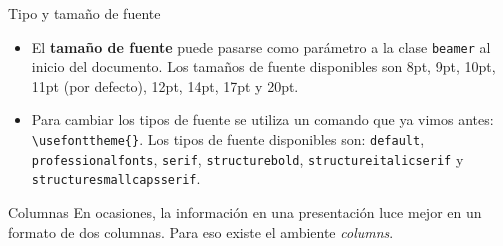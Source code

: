 \documentclass{beamer}
\begin{document}
    \begin{frame}[fragile]{Tipo y tamaño de fuente}
        \begin{minipage}{0.93\paperwidth}
        \begin{itemize}
            \justifying
            \item El \textbf{tamaño de fuente} puede pasarse como parámetro a la clase \texttt{beamer} al inicio del documento.
            Los tamaños de fuente disponibles son 8pt, 9pt, 10pt, 11pt (por defecto), 12pt, 14pt, 17pt y 20pt.
            \item Para cambiar los tipos de fuente se utiliza un comando que ya vimos antes:  {\color{mygreen} \verb|\usefonttheme{}|}.
            Los tipos de fuente disponibles son: \texttt{default}, \texttt{professionalfonts}, \texttt{serif}, \texttt{structurebold},
            \texttt{structureitalicserif} y \texttt{structuresmallcapsserif}.
        \end{itemize}
        \end{minipage}
    \end{frame}
    
    \begin{frame}[fragile]{Columnas}
        En ocasiones, la información en una presentación luce mejor en un formato de dos columnas. Para eso existe el ambiente
        \textsl{columns}.
        \vspace{5mm}
        \begin{center}
            \begin{minipage}{0.85\textwidth}
                \inputminted[fontsize=\tiny, frame=single]{latex}{two_columns.tex}
            \end{minipage}
        \end{center}
    \end{frame}
\end{document}
